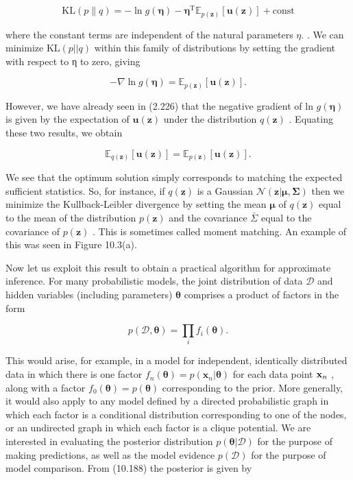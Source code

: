 \documentclass[
  10
]{article}
\begin{document}
\[
\mathrm{KL} (p \| q) = - \ln g (\pmb {\eta}) - \pmb {\eta} ^ {\mathrm{T}} \mathbb {E} _ {p (\mathbf {z})} [ \mathbf {u} (\mathbf {z}) ] + \mathrm{const}\tag{10.185}
\]

where the constant terms are independent of the natural parameters
\(\eta .\) . We can minimize \(\mathrm { K L } ( p | | q )\) within this
family of distributions by setting the gradient with respect to η to
zero, giving

\[
- \nabla \ln g (\boldsymbol {\eta}) = \mathbb {E} _ {p (\mathbf {z})} [ \mathbf {u} (\mathbf {z}) ].\tag{10.186}
\]

However, we have already seen in (2.226) that the negative gradient of
ln \(g ( \pmb { \eta } )\) is given by the expectation of
\(\mathbf { u } ( \mathbf { z } )\) under the distribution
\(q ( \mathbf { z } )\) . Equating these two results, we obtain

\[
\mathbb {E} _ {q (\mathbf {z})} [ \mathbf {u} (\mathbf {z}) ] = \mathbb {E} _ {p (\mathbf {z})} [ \mathbf {u} (\mathbf {z}) ].\tag{10.187}
\]

We see that the optimum solution simply corresponds to matching the
expected sufficient statistics. So, for instance, if
\(q ( \mathbf { z } )\) is a Gaussian
\(\mathcal { N } ( \mathbf { z } | \boldsymbol { \mu } , \boldsymbol { \Sigma } )\)
then we minimize the Kullback-Leibler divergence by setting the mean
\(\pmb { \mu }\) of \(q ( \mathbf { z } )\) equal to the mean of the
distribution \(p ( \mathbf { z } )\) and the covariance
\(\bar { \Sigma }\) equal to the covariance of \(p ( \mathbf { z } )\) .
This is sometimes called moment matching. An example of this was seen in
Figure 10.3(a).

Now let us exploit this result to obtain a practical algorithm for
approximate inference. For many probabilistic models, the joint
distribution of data \(\mathcal { D }\) and hidden variables (including
parameters) \(\pmb \theta\) comprises a product of factors in the form

\[
p (\mathcal {D}, \boldsymbol {\theta}) = \prod_ {i} f _ {i} (\boldsymbol {\theta}).\tag{10.188}
\]

This would arise, for example, in a model for independent, identically
distributed data in which there is one factor
\(f _ { n } ( \pmb { \theta } ) = p ( \mathbf { x } _ { n } | \pmb { \theta } )\)
for each data point \({ \bf x } _ { n }\) , along with a factor
\(f _ { 0 } ( \pmb { \theta } ) = p ( \pmb { \theta } )\) corresponding
to the prior. More generally, it would also apply to any model defined
by a directed probabilistic graph in which each factor is a conditional
distribution corresponding to one of the nodes, or an undirected graph
in which each factor is a clique potential. We are interested in
evaluating the posterior distribution
\(p ( \pmb \theta | \mathcal { D } )\) for the purpose of making
predictions, as well as the model evidence \(p ( \mathcal { D } )\) for
the purpose of model comparison. From (10.188) the posterior is given by
\end{document}
